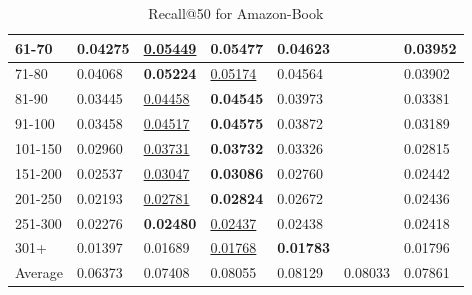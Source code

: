 \begin{table*}[]
\begin{tabular}{|l|l|l|l|l|l|l|}
        61-70     & 0.04275                        & \underline{0.05449}            & \textbf{0.05477}               & 0.04623                        &                                & 0.03952                               \\ \hline
        71-80     & 0.04068                        & \textbf{0.05224}               & \underline{0.05174}            & 0.04564                        &                                & 0.03902                               \\ \hline
        81-90     & 0.03445                        & \underline{0.04458}            & \textbf{0.04545}               & 0.03973                        &                                & 0.03381                               \\ \hline
        91-100    & 0.03458                        & \underline{0.04517}            & \textbf{0.04575}               & 0.03872                        &                                & 0.03189                               \\ \hline
        101-150   & 0.02960                        & \underline{0.03731}            & \textbf{0.03732}               & 0.03326                        &                                & 0.02815                               \\ \hline
        151-200   & 0.02537                        & \underline{0.03047}            & \textbf{0.03086}               & 0.02760                        &                                & 0.02442                               \\ \hline
        201-250   & 0.02193                        & \underline{0.02781}            & \textbf{0.02824}               & 0.02672                        &                                & 0.02436                               \\ \hline
        251-300   & 0.02276                        & \textbf{0.02480}               & \underline{0.02437}            & 0.02438                        &                                & 0.02418                               \\ \hline
        301+      & 0.01397                        & 0.01689                        & \underline{0.01768}            & \textbf{0.01783}               &                                & 0.01796                               \\ \hline
        Average   & 0.06373                        & 0.07408                        & 0.08055                        & 0.08129                        & 0.08033                        & 0.07861                               \\ \hline    
    \end{tabular}
    \caption{Recall@50 for Amazon-Book}
\end{table*}
